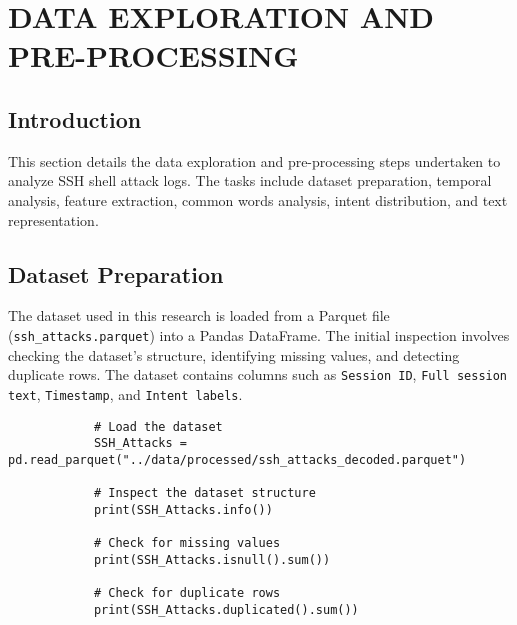 

\section{DATA EXPLORATION AND PRE-PROCESSING}


    \subsection{Introduction}

        This section details the data exploration and pre-processing steps undertaken to analyze SSH shell attack logs. The tasks include dataset preparation, temporal analysis, feature extraction, common words analysis, intent distribution, and text representation.

    \subsection{Dataset Preparation}
    
        The dataset used in this research is loaded from a Parquet file (\texttt{ssh\_attacks.parquet}) into a Pandas DataFrame. The initial inspection involves checking the dataset's structure, identifying missing values, and detecting duplicate rows. The dataset contains columns such as \texttt{Session ID}, \texttt{Full session text}, \texttt{Timestamp}, and \texttt{Intent labels}.

        \begin{verbatim}
            # Load the dataset
            SSH_Attacks = pd.read_parquet("../data/processed/ssh_attacks_decoded.parquet")
    
            # Inspect the dataset structure
            print(SSH_Attacks.info())
    
            # Check for missing values
            print(SSH_Attacks.isnull().sum())
    
            # Check for duplicate rows
            print(SSH_Attacks.duplicated().sum())
        \end{verbatim}

